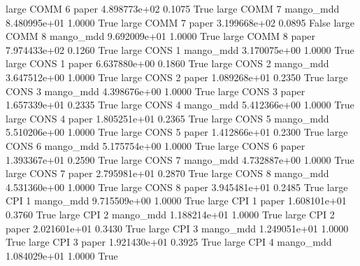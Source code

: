      large     COMM                 6                 paper 4.898773e+02      0.1075    True
     large     COMM                 7             mango_mdd 8.480995e+01      1.0000    True
     large     COMM                 7                 paper 3.199668e+02      0.0895   False
     large     COMM                 8             mango_mdd 9.692009e+01      1.0000    True
     large     COMM                 8                 paper 7.974433e+02      0.1260    True
     large     CONS                 1             mango_mdd 3.170075e+00      1.0000    True
     large     CONS                 1                 paper 6.637880e+00      0.1860    True
     large     CONS                 2             mango_mdd 3.647512e+00      1.0000    True
     large     CONS                 2                 paper 1.089268e+01      0.2350    True
     large     CONS                 3             mango_mdd 4.398676e+00      1.0000    True
     large     CONS                 3                 paper 1.657339e+01      0.2335    True
     large     CONS                 4             mango_mdd 5.412366e+00      1.0000    True
     large     CONS                 4                 paper 1.805251e+01      0.2365    True
     large     CONS                 5             mango_mdd 5.510206e+00      1.0000    True
     large     CONS                 5                 paper 1.412866e+01      0.2300    True
     large     CONS                 6             mango_mdd 5.175754e+00      1.0000    True
     large     CONS                 6                 paper 1.393367e+01      0.2590    True
     large     CONS                 7             mango_mdd 4.732887e+00      1.0000    True
     large     CONS                 7                 paper 2.795981e+01      0.2870    True
     large     CONS                 8             mango_mdd 4.531360e+00      1.0000    True
     large     CONS                 8                 paper 3.945481e+01      0.2485    True
     large      CPI                 1             mango_mdd 9.715509e+00      1.0000    True
     large      CPI                 1                 paper 1.608101e+01      0.3760    True
     large      CPI                 2             mango_mdd 1.188214e+01      1.0000    True
     large      CPI                 2                 paper 2.021601e+01      0.3430    True
     large      CPI                 3             mango_mdd 1.249051e+01      1.0000    True
     large      CPI                 3                 paper 1.921430e+01      0.3925    True
     large      CPI                 4             mango_mdd 1.084029e+01      1.0000    True
